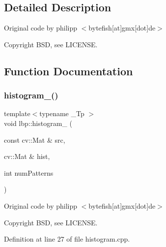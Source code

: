 \subsection{Detailed Description}
Original code by philipp $<$bytefish\mbox{[}at\mbox{]}gmx\mbox{[}dot\mbox{]}de$>$ 

\begin{DoxyCopyright}{Copyright}
B\+SD, see L\+I\+C\+E\+N\+SE. 
\end{DoxyCopyright}


\subsection{Function Documentation}
\mbox{\label{namespacelbp_a7a2d45fdc785282bc110d25495ef78d7}} 
\subsubsection{\texorpdfstring{histogram\_()}{histogram\_()}}
{\footnotesize\ttfamily template$<$typename \+\_\+\+Tp $>$ \\
void lbp\+::histogram\+\_\+ (\begin{DoxyParamCaption}\item[{const cv\+::\+Mat \&}]{src,  }\item[{cv\+::\+Mat \&}]{hist,  }\item[{int}]{num\+Patterns }\end{DoxyParamCaption})}



Original code by philipp $<$bytefish\mbox{[}at\mbox{]}gmx\mbox{[}dot\mbox{]}de$>$ 

\begin{DoxyCopyright}{Copyright}
B\+SD, see L\+I\+C\+E\+N\+SE. 
\end{DoxyCopyright}


Definition at line 27 of file histogram.\+cpp.


\begin{DoxyCode}{0}

\end{DoxyCode}
\mbox{\label{namespacelbp_a640337219aa7c2a5326fa41af8269cc5}} 
